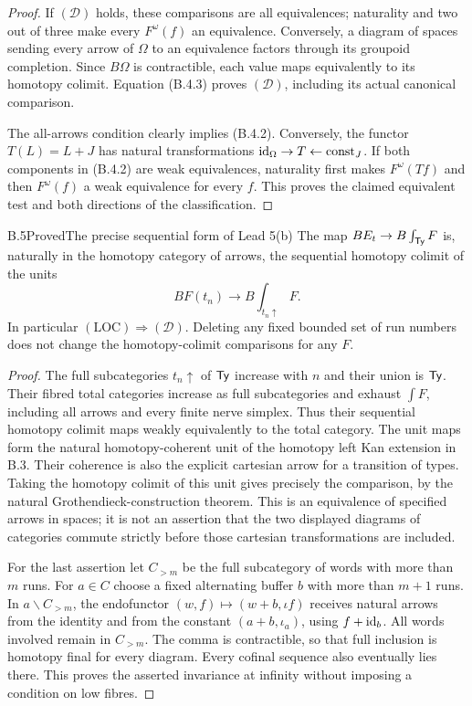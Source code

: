 \begin{proof}
If $(\mathcal D)$ holds, these comparisons are all equivalences;
naturality and two out of three make every $F^\omega(f)$ an
equivalence. Conversely, a diagram of spaces sending every arrow
of $\Omega$ to an equivalence factors through its groupoid
completion. Since $B\Omega$ is contractible, each value maps
equivalently to its homotopy colimit. Equation (B.4.3) proves
$(\mathcal D)$, including its actual canonical comparison.

The all-arrows condition clearly implies (B.4.2). Conversely,
the functor $T(L)=L+J$ has natural transformations
$\mathrm{id}_\Omega\to T\leftarrow\mathrm{const}_J$.
If both components in (B.4.2) are weak equivalences, naturality
first makes $F^\omega(Tf)$ and then $F^\omega(f)$ a weak
equivalence for every $f$. This proves the claimed equivalent
test and both directions of the classification.
\end{proof}

\begin{claim}{B.5}{Proved}{The precise sequential form of Lead 5(b)}
\label{B:infinity}
The map $BE_t\to B\int_{\mathsf{Ty}}F$ is, naturally in the homotopy
category of arrows, the sequential homotopy colimit of the units
\[
 BF(t_n)\longrightarrow B\int_{t_n\uparrow}F.
\]
In particular $(\mathrm{LOC})\Rightarrow(\mathcal D)$.
Deleting any fixed bounded set of run numbers does not change
the homotopy-colimit comparisons for any $F$.
\end{claim}
\begin{proof}
The full subcategories $t_n\uparrow$ of $\mathsf{Ty}$ increase with $n$
and their union is $\mathsf{Ty}$. Their fibred total categories increase
as full subcategories and exhaust $\int F$, including all arrows
and every finite nerve simplex. Thus their sequential homotopy
colimit maps weakly equivalently to the total category. The unit
maps form the natural homotopy-coherent unit of the homotopy left
Kan extension in B.3. Their coherence is also the explicit
cartesian arrow for a transition of types. Taking the homotopy
colimit of this unit gives precisely the comparison, by the
natural Grothendieck-construction theorem. This is an equivalence
of specified arrows in spaces; it is not an assertion that the
two displayed diagrams of categories commute strictly before
those cartesian transformations are included.

For the last assertion let $C_{>m}$ be the full subcategory of
words with more than $m$ runs. For $a\in C$ choose a fixed
alternating buffer $b$ with more than $m+1$ runs. In
$a\backslash C_{>m}$, the endofunctor $(w,f)\mapsto(w+b,\iota f)$
receives natural arrows from the identity and from the constant
$(a+b,\iota_a)$, using $f+\mathrm{id}_b$. All words involved remain
in $C_{>m}$. The comma is contractible, so that full inclusion
is homotopy final for every diagram. Every cofinal sequence also
eventually lies there. This proves the asserted invariance at
infinity without imposing a condition on low fibres.
\end{proof}

